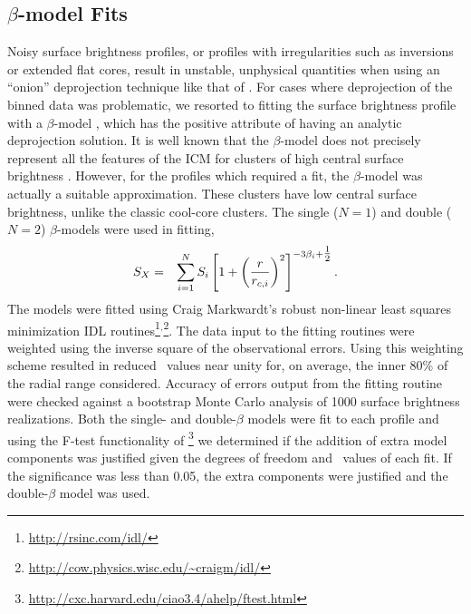 \documentclass[12pt,preprint]{aastex}
\begin{document}
\subsection{$\beta$-model Fits}
\label{sec:beta}

Noisy surface brightness profiles, or profiles with irregularities
such as inversions or extended flat cores, result in unstable,
unphysical quantities when using an ``onion'' deprojection technique
like that of \citet{kriss83}. For cases where deprojection of the
binned data was problematic, we resorted to fitting the surface
brightness profile with a $\beta$-model \citep{1978A&A....70..677C},
which has the positive attribute of having an analytic deprojection
solution. It is well known that the $\beta$-model does not precisely
represent all the features of the ICM for clusters of high central
surface brightness \citep{2000MNRAS.311..313E, 2002ApJ...579..571L,
  2007ApJ...665..911H}. However, for the profiles which required a
fit, the $\beta$-model was actually a suitable approximation. These
clusters have low central surface brightness, unlike the classic
cool-core clusters. The single ($N=1$) and double ($N=2$)
$\beta$-models were used in fitting,
\begin{eqnarray}
S_X &=& \displaystyle\sum_{i=1}^N S_i
\left[1+\left(\frac{r}{r_{c,i}}\right)^2\right]^{-3\beta_i+\mbox{$\frac{1}{2}$}}.
\end{eqnarray}
The models were fitted using Craig Markwardt's robust non-linear least
squares minimization IDL
routines\footnote{\url{http://rsinc.com/idl/}}$^{,}$\footnote{\url{http://cow.physics.wisc.edu/~craigm/idl/}}. The
data input to the fitting routines were weighted using the inverse
square of the observational errors. Using this weighting scheme
resulted in reduced \chisq\ values near unity for, on average, the
inner 80\% of the radial range considered. Accuracy of errors output
from the fitting routine were checked against a bootstrap Monte Carlo
analysis of 1000 surface brightness realizations. Both the single- and
double-$\beta$ models were fit to each profile and using the F-test
functionality of
\sherpa\footnote{\url{http://cxc.harvard.edu/ciao3.4/ahelp/ftest.html}}
we determined if the addition of extra model components was justified
given the degrees of freedom and \chisq\ values of each fit. If the
significance was less than 0.05, the extra components were justified
and the double-$\beta$ model was used.
\end{document}
